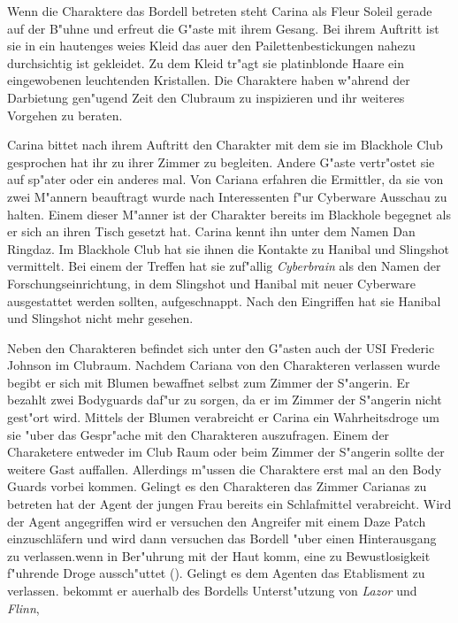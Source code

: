 Wenn die Charaktere das Bordell betreten steht Carina als Fleur Soleil gerade auf der B"uhne und erfreut die G"aste mit ihrem Gesang. Bei ihrem Auftritt ist sie in ein hautenges wei\3es Kleid das au\3er den Pailettenbestickungen nahezu durchsichtig ist gekleidet. Zu dem Kleid tr"agt sie platinblonde Haare ein eingewobenen leuchtenden Kristallen. Die Charaktere haben w"ahrend der Darbietung gen"ugend Zeit den Clubraum zu inspizieren und ihr weiteres Vorgehen zu beraten.

Carina bittet nach ihrem Auftritt den Charakter mit dem sie im Blackhole Club gesprochen hat ihr zu ihrer Zimmer zu begleiten. Andere G"aste vertr"ostet sie auf sp"ater oder ein anderes mal. Von Cariana erfahren die Ermittler, da\3 sie von zwei M"annern beauftragt wurde nach Interessenten f"ur Cyberware Ausschau zu halten. Einem dieser M"anner ist der Charakter bereits im Blackhole begegnet als er sich an ihren Tisch gesetzt hat. Carina kennt ihn unter dem Namen Dan Ringdaz. Im Blackhole Club hat sie ihnen die Kontakte zu Hanibal und Slingshot vermittelt. Bei einem der Treffen hat sie zuf"allig \emph{Cyberbrain} als den Namen der Forschungseinrichtung, in dem Slingshot und Hanibal mit neuer Cyberware ausgestattet werden sollten, aufgeschnappt. Nach den Eingriffen hat sie Hanibal und Slingshot nicht mehr gesehen.

Neben den Charakteren befindet sich unter den G"asten auch der USI {\emph{}Frederic Johnson} im Clubraum. Nachdem Cariana von den Charakteren verlassen wurde begibt er sich mit Blumen bewaffnet selbst zum Zimmer der S"angerin. Er bezahlt zwei Bodyguards daf"ur zu sorgen, da\3 er im Zimmer der S"angerin nicht gest"ort wird. Mittels der Blumen verabreicht er Carina ein Wahrheitsdroge um sie "uber das Gespr"ache mit den Charakteren auszufragen. Einem der Charaketere entweder im Club Raum oder beim Zimmer der S"angerin sollte der weitere Gast auffallen. Allerdings m"ussen die Charaktere erst mal an den Body Guards vorbei kommen. Gelingt es den Charakteren das Zimmer Carianas zu betreten hat der Agent der jungen Frau bereits ein Schlafmittel verabreicht. Wird der Agent angegriffen wird er versuchen den Angreifer mit einem Daze Patch einzuschläfern und wird dann versuchen das Bordell "uber einen Hinterausgang zu verlassen.wenn in Ber"uhrung mit der Haut komm, eine zu Bewustlosigkeit f"uhrende Droge aussch"uttet (). Gelingt es dem Agenten das Etablisment zu verlassen. bekommt er au\3erhalb des Bordells Unterst"utzung von \emph{Lazor} und \emph{Flinn},

